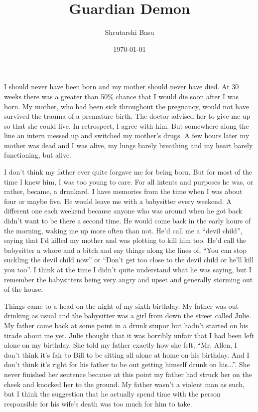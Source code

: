 \documentclass[11pt,letterpaper]{article}
\title{Guardian Demon}
\author{Shrutarshi Basu}
\date{\today}
\begin{document}
\maketitle
\doublespacing

I should never have been born and my mother should never have died. At 30 weeks there was a greater than 50\% chance that I would die soon after I was born. My mother, who had been sick throughout the pregnancy, would not have survived the trauma of a premature birth. The doctor advised her to give me up so that she could live. In retrospect, I agree with him. But somewhere along the line an intern messed up and switched my mother's drugs. A few hours later my mother was dead and I was alive, my lungs barely breathing and my heart barely functioning, but alive.

I don't think my father ever quite forgave me for being born. But for most of the time I knew him, I was too young to care. For all intents and purposes he was, or rather, became, a drunkard. I have memories from the time when I was about four or maybe five. He would leave me with a babysitter every weekend. A different one each weekend because anyone who was around when he got back didn't want to be there a second time. He would come back in the early hours of the morning, waking me up more often than not. He'd call me a ``devil child'', saying that I'd killed my mother and was plotting to kill him too. He'd call the babysitter a whore and a bitch and say things along the lines of, ``You can stop suckling the devil child now'' or ``Don't get too close to the devil child or he'll kill you too''. I think at the time I didn't quite understand what he was saying, but I remember the babysitters being very angry and upset and generally storming out of the house.

Things came to a head on the night of my sixth birthday. My father was out drinking as usual and the babysitter was a girl from down the street called Julie. My father came back at some point in a drunk stupor but hadn't started on his tirade about me yet. Julie thought that it was horribly unfair that I had been left alone on my birthday. She told my father exactly how she felt, ``Mr. Allen, I don't think it's fair to Bill to be sitting all alone at home on his birthday. And I don't think it's right for his father to be out getting himself drunk on his...''. She never finished her sentence because at this point my father had struck her on the cheek and knocked her to the ground. My father wasn't a violent man as such, but I think the suggestion that he actually spend time with the person responsible for his wife's death was too much for him to take.
\end{document}
